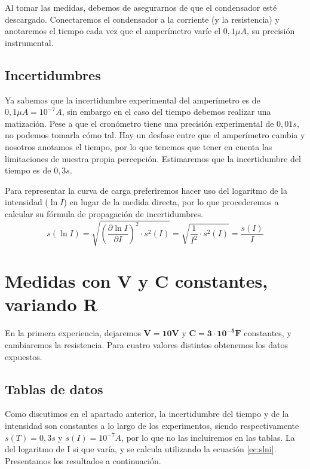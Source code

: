 \documentclass[12pt, a4paper, titlepage]{article}
\begin{document}
  Al tomar las medidas, debemos de asegurarnos de que el condensador esté descargado. Conectaremos el condensador a la corriente (y la resistencia) y anotaremos el tiempo cada vez que el amperímetro varíe el $0,1 \mu A$, su precisión instrumental.

  \subsection{Incertidumbres}

  Ya sabemos que la incertidumbre experimental del amperímetro es de $0,1 \mu A = 10^{-7} A$, sin embargo en el caso del tiempo debemos realizar una matización. Pese a que el cronómetro tiene una precisión experimental de $0,01 s$, no podemos tomarla cómo tal. Hay un desfase entre que el amperímetro cambia y nosotros anotamos el tiempo, por lo que tenemos que tener en cuenta las limitaciones de nuestra propia percepción. Estimaremos que la incertidumbre del tiempo es de $0,3 s$.

  Para representar la curva de carga preferiremos hacer uso del logaritmo de la intensidad ($\ln{I}$) en lugar de la medida directa, por lo que procederemos a calcular su fórmula de propagación de incertidumbres.
  \begin{equation}
    s(\ln{I}) = \sqrt{\left( \frac{\partial \ln{I}}{\partial I} \right)^2 \cdot s^2(I)} = \sqrt{\frac{1}{I^2} \cdot s^2(I)} = \frac{s(I)}{I} \label{ec:slni}
  \end{equation}

  \newpage
  \section{Medidas con \textbf{V} y \textbf{C} constantes, variando \textbf{R}}

  En la primera experiencia, dejaremos $\mathbf{V = 10V}$ y $\mathbf{C = 3 \cdot 10^{-5} F}$ constantes, y cambiaremos la resistencia. Para cuatro valores distintos obtenemos los datos expuestos.

  \subsection{Tablas de datos}

  Como discutimos en el apartado anterior, la incertidumbre del tiempo y de la intensidad son constantes a lo largo de los experimentos, siendo respectivamente $s(T) = 0,3 s$ y $s(I) = 10^{-7} A$, por lo que no las incluiremos en las tablas. La del logaritmo de I si que varía, y se calcula utilizando la ecuación \ref{ec:slni}. Presentamos los resultados a continuación.
\end{document}
